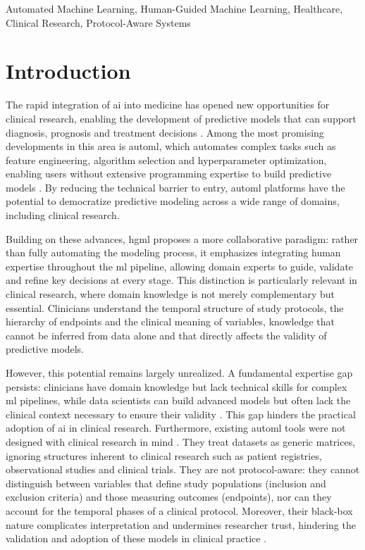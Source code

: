 \documentclass[conference,twocolumn]{IEEEtran}
\begin{document}
\begin{IEEEkeywords}
Automated Machine Learning, Human-Guided Machine Learning, Healthcare, Clinical Research, Protocol-Aware Systems
\end{IEEEkeywords}


\section{Introduction}
\label{sec:introduction}

The rapid integration of \gls{ai} into medicine has opened new opportunities for clinical research, enabling the development of predictive models that can support diagnosis, prognosis and treatment decisions \cite{sirocchi2024medical}. Among the most promising developments in this area is \gls{automl}, which automates complex tasks such as feature engineering, algorithm selection and hyperparameter optimization, enabling users without extensive programming expertise to build predictive models \cite{karmaker2021automl}. By reducing the technical barrier to entry, \gls{automl} platforms have the potential to democratize predictive modeling across a wide range of domains, including clinical research.

Building on these advances, \gls{hgml} \cite{gil2019towards} proposes a more 
collaborative paradigm: rather than fully automating the modeling process, it emphasizes integrating human expertise throughout the \gls{ml} pipeline, allowing domain experts to guide, validate and refine key decisions at every stage. This distinction is particularly relevant in clinical research, where domain knowledge is not merely complementary but essential. Clinicians understand the temporal structure of study protocols, the hierarchy of endpoints and the clinical meaning of variables, knowledge that cannot be inferred from data alone and that directly affects the validity of predictive models.

However, this potential remains largely unrealized. A fundamental expertise gap persists: clinicians have domain knowledge but lack technical skills for complex \gls{ml} pipelines, while data scientists can build advanced models but often lack the clinical context necessary to ensure their validity \cite{gisselbaek2025bridging}. This gap hinders the practical adoption of \gls{ai} in clinical research. Furthermore, existing \gls{automl} tools were not designed with clinical research in mind \cite{waring2020automated}. They treat datasets as generic matrices, ignoring structures inherent to clinical research such as patient registries, observational studies and clinical trials. They are not protocol-aware: they cannot distinguish between variables that define study populations (inclusion and exclusion criteria) and those measuring outcomes (endpoints), nor can they account for the temporal phases of a clinical protocol. Moreover, their black-box nature complicates interpretation and undermines researcher trust, hindering the validation and adoption of these models in clinical practice \cite{sirocchi2024medical}.
\end{document}

